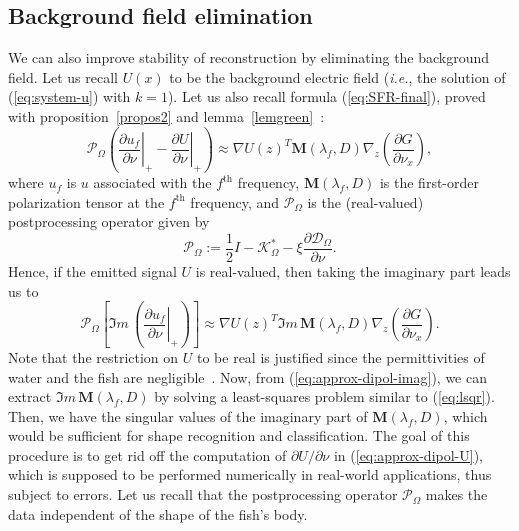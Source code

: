 \subsection{Background field elimination}

We can also improve stability of reconstruction by eliminating the
background field. Let us recall $U(x)$ to be the background electric
field ({\it i.e.}, the solution of (\ref{eq:system-u}) with
$k=1$). Let us also recall formula (\ref{eq:SFR-final}), proved with 
proposition~\ref{propos2} and lemma~\ref{lemgreen}~:
\begin{equation}
\mathcal{P}_\Omega \left(  \left.\frac{\partial u_f}{\partial
\nu}\right|_+ - \left.\frac{\partial U}{\partial \nu}\right|_+
\right) \approx \nabla U(z)^T \mathbf{M}(\lambda_f,D) \nabla_z \left(
\frac{\partial G}{\partial \nu_x}\right),
\label{eq:approx-dipol-U}
\end{equation}
where $u_f$ is $u$ associated with the $f^{\textrm{th}}$
frequency, $\mathbf{M}(\lambda_f,D)$ is the first-order polarization
tensor at the  $f^{\textrm{th}}$ frequency, and
$\mathcal{P}_\Omega$ is the (real-valued) postprocessing operator
given by
$$
\mathcal{P}_\Omega:= \frac{1}{2} I - \mathcal{K}_\Omega^* - \xi
\frac{\partial \mathcal{D}_\Omega}{\partial \nu}.
$$
Hence, if the emitted signal $U$ is real-valued, then taking the
imaginary part leads us to
\begin{equation}
\mathcal{P}_\Omega \left[ \Im m \, \left( \left.\frac{\partial
u_f}{\partial \nu}\right|_+  \right) \right] \approx \nabla U(z)^T
\Im m \,  \mathbf{M}(\lambda_f,D)  \nabla_z \left( \frac{\partial
G}{\partial \nu_x}\right). \label{eq:approx-dipol-imag}
\end{equation}
Note that the restriction on $U$ to be
real is justified since the permittivities of water and the fish
are negligible~\cite{caputi1998electric,scheich1973coding}. Now, from
(\ref{eq:approx-dipol-imag}), we can extract $\Im m\,
\mathbf{M}(\lambda_f,D)$ by solving a least-squares problem similar
to (\ref{eq:lsqr}). Then, we have the singular values of the
imaginary part of $\mathbf{M}(\lambda_f,D)$, which would be
sufficient for shape recognition and classification. The goal of
this procedure is to get rid off the computation of $
\partial U/\partial \nu$ in (\ref{eq:approx-dipol-U}), which is
supposed to be performed numerically in real-world applications,
thus subject to errors. Let us recall that the postprocessing operator
${\mathcal P}_\Omega$ makes the data independent of the shape of
the fish's body.

